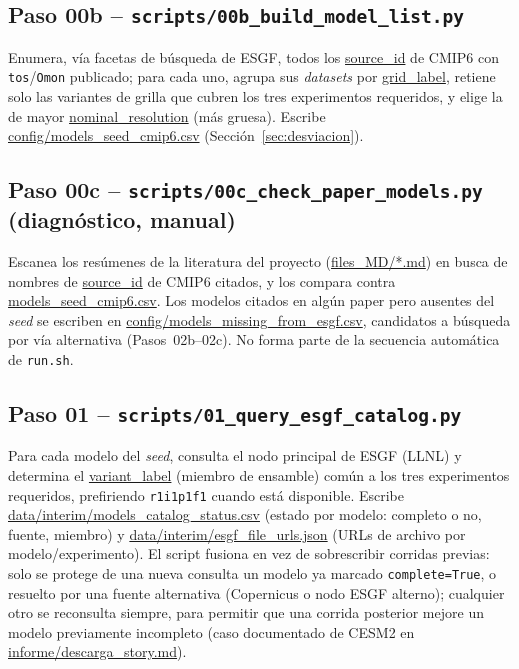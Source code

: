 \documentclass[11pt,a4paper]{article}
\newcommand{\archivo}[1]{\begingroup\hypersetup{urlcolor=black}\url{#1}\endgroup}
\begin{document}
\subsection{Paso 00b -- \texttt{scripts/00b\_build\_model\_list.py}}
Enumera, v\'ia facetas de b\'usqueda de ESGF, todos los \archivo{source_id} de CMIP6 con \texttt{tos}/\texttt{Omon} publicado; para cada uno, agrupa sus \emph{datasets} por \archivo{grid_label}, retiene solo las variantes de grilla que cubren los tres experimentos requeridos, y elige la de mayor \archivo{nominal_resolution} (m\'as gruesa). Escribe \archivo{config/models_seed_cmip6.csv} (Secci\'on~\ref{sec:desviacion}).

\subsection{Paso 00c -- \texttt{scripts/00c\_check\_paper\_models.py} (diagn\'ostico, manual)}
Escanea los resúmenes de la literatura del proyecto (\archivo{files_MD/*.md}) en busca de nombres de \archivo{source_id} de CMIP6 citados, y los compara contra \archivo{models_seed_cmip6.csv}. Los modelos citados en alg\'un paper pero ausentes del \emph{seed} se escriben en \archivo{config/models_missing_from_esgf.csv}, candidatos a b\'usqueda por v\'ia alternativa (Pasos~02b--02c). No forma parte de la secuencia autom\'atica de \texttt{run.sh}.

\subsection{Paso 01 -- \texttt{scripts/01\_query\_esgf\_catalog.py}}
Para cada modelo del \emph{seed}, consulta el nodo principal de ESGF (LLNL) y determina el \archivo{variant_label} (miembro de ensamble) com\'un a los tres experimentos requeridos, prefiriendo \texttt{r1i1p1f1} cuando est\'a disponible. Escribe \archivo{data/interim/models_catalog_status.csv} (estado por modelo: completo o no, fuente, miembro) y \archivo{data/interim/esgf_file_urls.json} (URLs de archivo por modelo/experimento). El script fusiona en vez de sobrescribir corridas previas: solo se protege de una nueva consulta un modelo ya marcado \texttt{complete=True}, o resuelto por una fuente alternativa (Copernicus o nodo ESGF alterno); cualquier otro se reconsulta siempre, para permitir que una corrida posterior mejore un modelo previamente incompleto (caso documentado de CESM2 en \archivo{informe/descarga_story.md}).
\end{document}
